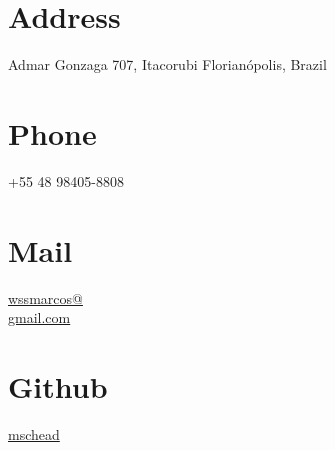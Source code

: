 \documentclass{friggeri-cv}
\begin{document}
      

\begin{aside}
  \section{Address}
    Admar Gonzaga
    707, Itacorubi
    Florianópolis, Brazil
    ~
  \section{Phone}
    +55 48 98405-8808
    ~
  \section{Mail}
    \href{mailto:wssmarcos@gmail.com}{wssmarcos@\\gmail.com}
    ~
  \section{Github}
    \href{https://github.com/mschead}{mschead}
    ~

\end{aside}
\end{document}
